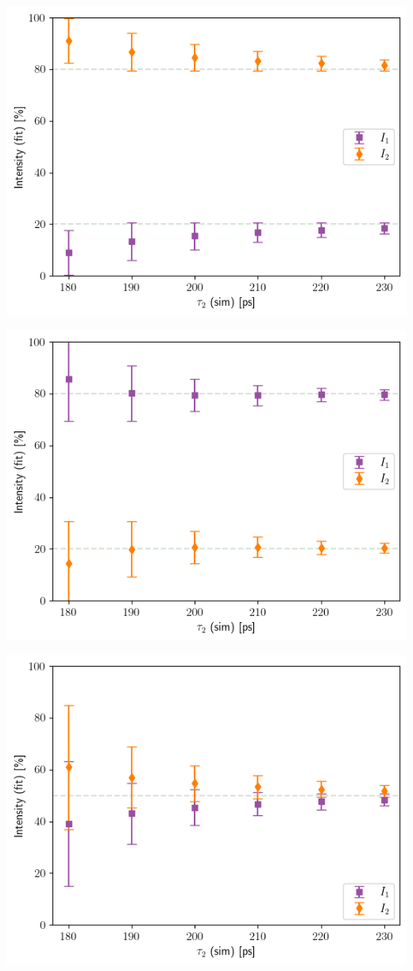 {\begin{minipage}{ .47\linewidth}
    \includegraphics[width=\linewidth]{Batch 3/single Gaussian IRF/gauss210/150/output/plotfin/2080.png}
    \label{fig:1g-2080}
\end{minipage}
\hfill
\begin{minipage}{ .47\linewidth}
    \includegraphics[width=\linewidth]{Batch 3/single Gaussian IRF/gauss210/150/output/plotfin/8020.png}
    \label{fig:1g-8020}
\end{minipage}
\begin{minipage}{\linewidth}
    \includegraphics[width= .47\linewidth]{Batch 3/single Gaussian IRF/gauss210/150/output/plotfin/5050.png}
    \label{fig:1g-5050}
\end{minipage}


}
